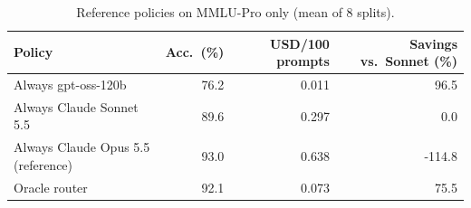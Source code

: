 \begin{table}[!htbp]
\centering\small
\caption{Reference policies on MMLU-Pro only (mean of 8 splits).}\label{tab:ref_mmlu}
\begin{tabular}{lrrr}
\toprule
Policy & Acc.\ (\%) & USD/100 prompts & Savings vs.\ Sonnet (\%) \\
\midrule
Always gpt-oss-120b & 76.2 & 0.011 & 96.5 \\
Always Claude Sonnet 5.5 & 89.6 & 0.297 & 0.0 \\
Always Claude Opus 5.5 (reference) & 93.0 & 0.638 & -114.8 \\
Oracle router & 92.1 & 0.073 & 75.5 \\
\bottomrule
\end{tabular}
\end{table}
